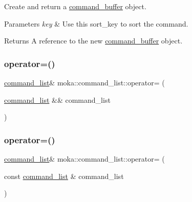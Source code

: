 Create and return a \mbox{\hyperlink{classmoka_1_1command__buffer}{command\+\_\+buffer}} object. 


\begin{DoxyParams}{Parameters}
{\em key} & Use this sort\+\_\+key to sort the command. \\
\hline
\end{DoxyParams}
\begin{DoxyReturn}{Returns}
A reference to the new \mbox{\hyperlink{classmoka_1_1command__buffer}{command\+\_\+buffer}} object. 
\end{DoxyReturn}
\mbox{\label{classmoka_1_1command__list_a0ac12e3c124d04ca19cdabef228e5d25}} 
\subsubsection{\texorpdfstring{operator=()}{operator=()}\hspace{0.1cm}{\footnotesize\ttfamily [1/2]}}
{\footnotesize\ttfamily \mbox{\hyperlink{classmoka_1_1command__list}{command\+\_\+list}}\& moka\+::command\+\_\+list\+::operator= (\begin{DoxyParamCaption}\item[{\mbox{\hyperlink{classmoka_1_1command__list}{command\+\_\+list}} \&\&}]{command\+\_\+list }\end{DoxyParamCaption})\hspace{0.3cm}{\ttfamily [noexcept]}}

\mbox{\label{classmoka_1_1command__list_a9199b2f5a07d8fc13d30712c557771c5}} 
\subsubsection{\texorpdfstring{operator=()}{operator=()}\hspace{0.1cm}{\footnotesize\ttfamily [2/2]}}
{\footnotesize\ttfamily \mbox{\hyperlink{classmoka_1_1command__list}{command\+\_\+list}}\& moka\+::command\+\_\+list\+::operator= (\begin{DoxyParamCaption}\item[{const \mbox{\hyperlink{classmoka_1_1command__list}{command\+\_\+list}} \&}]{command\+\_\+list }\end{DoxyParamCaption})\hspace{0.3cm}{\ttfamily [delete]}}

